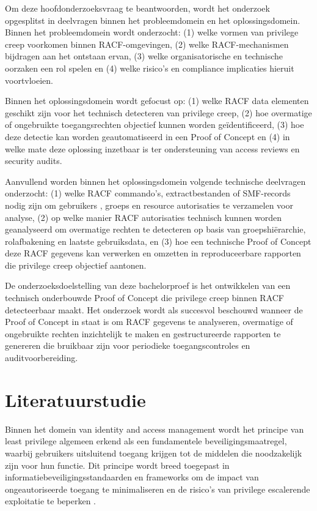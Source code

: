 Om deze hoofdonderzoeksvraag te beantwoorden, wordt het onderzoek opgesplitst in deelvragen binnen het probleemdomein en het oplossingsdomein. Binnen het probleemdomein wordt onderzocht: (1) welke vormen van privilege creep voorkomen binnen RACF-omgevingen, (2) welke RACF-mechanismen bijdragen aan het ontstaan ervan, (3) welke organisatorische en technische oorzaken een rol spelen en (4) welke risico’s en compliance implicaties hieruit voortvloeien.

Binnen het oplossingsdomein wordt gefocust op: (1) welke RACF data elementen geschikt zijn voor het technisch detecteren van privilege creep, (2) hoe overmatige of ongebruikte toegangsrechten objectief kunnen worden geïdentificeerd, (3) hoe deze detectie kan worden geautomatiseerd in een Proof of Concept en (4) in welke mate deze oplossing inzetbaar is ter ondersteuning van access reviews en security audits.

Aanvullend worden binnen het oplossingsdomein volgende technische deelvragen onderzocht: (1) welke RACF commando’s, extractbestanden of SMF-records nodig zijn om gebruikers , groeps en resource autorisaties te verzamelen voor analyse, (2) op welke manier RACF autorisaties technisch kunnen worden geanalyseerd om overmatige rechten te detecteren op basis van groepshiërarchie, rolafbakening en laatste gebruiksdata, en (3) hoe een technische Proof of Concept deze RACF gegevens kan verwerken en omzetten in reproduceerbare rapporten die privilege creep objectief aantonen.

De onderzoeksdoelstelling van deze bachelorproef is het ontwikkelen van een technisch onderbouwde Proof of Concept die privilege creep binnen RACF detecteerbaar maakt. Het onderzoek wordt als succesvol beschouwd wanneer de Proof of Concept in staat is om RACF gegevens te analyseren, overmatige of ongebruikte rechten inzichtelijk te maken en gestructureerde rapporten te genereren die bruikbaar zijn voor periodieke toegangscontroles en auditvoorbereiding.


\section{Literatuurstudie}%
\label{sec:literatuurstudie}

Binnen het domein van identity and access management wordt het principe van least privilege algemeen erkend als een fundamentele beveiligingsmaatregel, waarbij gebruikers uitsluitend toegang krijgen tot de middelen die noodzakelijk zijn voor hun functie. Dit principe wordt breed toegepast in informatiebeveiligingsstandaarden en frameworks om de impact van ongeautoriseerde toegang te minimaliseren en de risico’s van privilege escalerende exploitatie te beperken \autocite{PrivilegePrinciple2026, ADMINGUIDE2026}.

